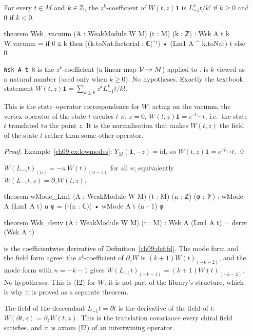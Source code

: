 \begin{theorem}[$W(t,z)\mathbf1=e^{zL_{-1}}t$]\label{ch09:thm:Wvac}
For every $t\in M$ and $k\in{\mathbb{Z}}$, the $z^k$-coefficient of $W(t,z)\mathbf 1$ is
$L_{-1}^kt/k!$ if $k\ge0$ and $0$ if $k<0$.
\end{theorem}
\begin{leancode}
theorem Wsk_vacuum (A : WeakModule W M) (t : M) (k : ℤ) :
    Wsk A t k W.vacuum
      = if 0 ≤ k then ((k.toNat.factorial : ℂ)⁻¹) • (Lm1 A ^ k.toNat) t else 0
\end{leancode}
\begin{dictionary}
\texttt{Wsk A t k} is the $z^k$-coefficient (a linear map $\mathcal{V}\to M$) applied to
.  is $k$ viewed as a natural number (used only when $k\ge0$). No
hypotheses. Exactly the textbook statement $W(t,z)\mathbf 1=\sum_{k\ge0}z^kL_{-1}^kt/k!$.
\end{dictionary}
\begin{physics}
This is the state--operator correspondence for $W$: acting on the vacuum, the vertex operator of the state $t$ creates $t$ at $z=0$, $W(t,z)\mathbf1=e^{zL_{-1}}t$, i.e.\ the state $t$ translated to the point $z$. It is the normalisation that makes $W(t,z)$ the field of the state $t$ rather than some other operator.
\end{physics}

\noindent\emph{Proof.} Example~\ref{ch09:ex:lowmodes}: $Y_M(\mathbf1,-z)=\mathrm{id}$, so
$W(t,z)\mathbf1=e^{zL_{-1}}t$. \qed

\begin{theorem}\label{ch09:thm:Wderiv}
$W(L_{-1}t)_{(n)}=-n\,W(t)_{(n-1)}$ for all $n$; equivalently $W(L_{-1}t,z)=\partial_zW(t,z)$.
\end{theorem}
\begin{leancode}
theorem wMode_Lm1 (A : WeakModule W M) (t : M) (n : ℤ) (φ : 𝒱) :
    wMode A (Lm1 A t) n φ = (-(n : ℂ)) • wMode A t (n - 1) φ

theorem Wsk_deriv (A : WeakModule W M) (t : M) :
    Wsk A (Lm1 A t) = deriv (Wsk A t)
\end{leancode}
\begin{dictionary}
 is the coefficientwise derivative of Definition~\ref{ch09:def:fd}. The mode form
and the field form agree: the $z^k$-coefficient of $\partial_zW$ is $(k+1)W(t)_{(-k-2)}$, and the
mode form with $n=-k-1$ gives $W(L_{-1}t)_{(-k-1)}=(k+1)W(t)_{(-k-2)}$. No hypotheses. This is
(I2) for $W$; it is not part of the library's  structure, which is why it is
proved as a separate theorem.
\end{dictionary}
\begin{physics}
The field of the descendant $L_{-1}t=\partial t$ is the derivative of the field of $t$: $W(\partial t,z)=\partial_zW(t,z)$. This is the translation covariance every chiral field satisfies, and it is axiom (I2) of an intertwining operator.
\end{physics}

